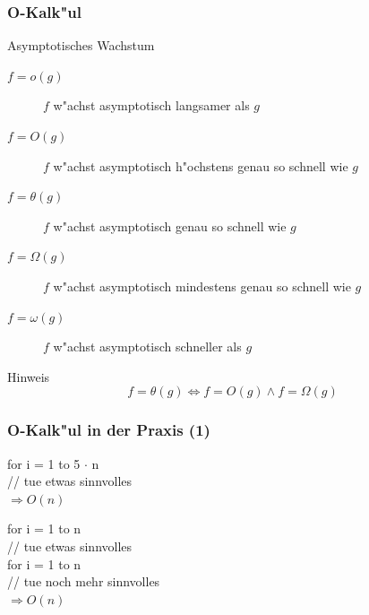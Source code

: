 \documentclass{beamer}
\begin{document}
\begin{frame}
\frametitle{O-Kalk"ul}

\pause

\begin{block}{Asymptotisches Wachstum}
\pause
\begin{description}
\item[$f = o(g)$] $f$ w"achst asymptotisch langsamer als $g$
\item[$f = O(g)$] $f$ w"achst asymptotisch h"ochstens genau so schnell wie $g$
\item[$f = \theta(g)$] $f$ w"achst asymptotisch genau so schnell wie $g$
\item[$f = \Omega(g)$] $f$ w"achst asymptotisch mindestens genau so schnell wie $g$
\item[$f = \omega(g)$] $f$ w"achst asymptotisch schneller als $g$
\end{description}
\end{block}

\pause

\begin{block}{Hinweis}
$$f = \theta(g) \Longleftrightarrow f = O(g) \wedge f = \Omega(g)$$

\end{block}
\end{frame}


\begin{frame}
\frametitle{O-Kalk"ul in der Praxis (1)}
\begin{exampleblock}{}
for i = 1 to 5 $\cdot$ n\\
	\hspace{1cm} // tue etwas sinnvolles\\[0.5cm]
\pause
$\Longrightarrow O(n)$
\end{exampleblock}

\pause

\begin{exampleblock}{}
for i = 1 to n\\
	\hspace{1cm} // tue etwas sinnvolles\\
for i = 1 to n\\
	\hspace{1cm} // tue noch mehr sinnvolles\\[0.5cm]
\pause
$\Longrightarrow O(n)$
\end{exampleblock}
\end{frame}
\end{document}

